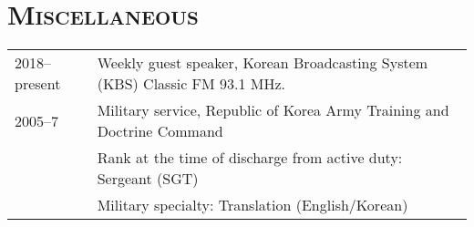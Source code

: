 \documentclass[a4paper,11pt,draft]{article}
\begin{document}
  
  \section*{\textsc{Miscellaneous}}
  
  \hspace*{-0.25cm}
  \begin{tabular}{p{2.5cm} l}
    2018–present & Weekly guest speaker, Korean Broadcasting System (KBS)
    Classic FM 93.1 MHz.\\
    
    2005–7 & Military service, Republic of Korea Army Training and Doctrine
    Command\\
    & Rank at the time of discharge from active duty: Sergeant (SGT)\\
    & Military specialty: Translation (English/Korean)
  \end{tabular}
\end{document}
